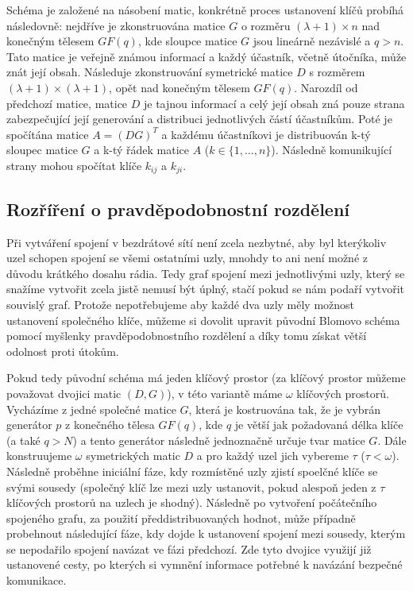\documentclass[11pt,final,twoside]{fithesis2}
\begin{document}
Schéma je založené na násobení matic, konkrétně proces ustanovení klíčů probíhá následovně: 
nejdříve je zkonstruována matice $G$ o rozměru $(\lambda + 1) \times n$ nad konečným tělesem $GF(q)$, kde sloupce matice $G$ jsou lineárně nezávislé a $q > n$.
Tato matice je veřejně známou informací a každý účastník, včetně útočníka, může znát její obsah. Následuje zkonstruování symetrické matice $D$ s rozměrem $(\lambda + 1) \times (\lambda + 1) $, 
opět nad konečným tělesem $GF(q)$. Narozdíl od předchozí matice, matice $D$ je tajnou informací a celý její obsah zná pouze strana zabezpečující její generování a distribuci jednotlivých částí 
účastníkům. Poté je spočítána matice $A= (DG)^T$ a každému účastníkovi je distribuován k-tý sloupec matice $G$ a k-tý řádek matice $A$ ($k \in \{1, \dots , n\}$). Následně komunikující strany
mohou spočítat klíče $k_{ij}$ a $k_{ji}$.  

\subsection{Rozříření o pravděpodobnostní rozdělení}
Při vytváření spojení v bezdrátové sítí není zcela nezbytné, aby byl kterýkoliv uzel schopen spojení se všemi ostatními uzly, mnohdy to ani není možné z důvodu krátkého dosahu rádia. Tedy
graf spojení mezi jednotlivými uzly, který se snažíme vytvořit zcela jistě nemusí být úplný, stačí pokud se nám podaří vytvořit souvislý graf. Protože nepotřebujeme aby každé dva uzly 
měly možnost ustanovení společného klíče, můžeme si dovolit upravit původní Blomovo schéma pomocí myšlenky pravděpodobnostního rozdělení a díky tomu získat větší odolnost proti útokům. 

Pokud tedy původní schéma má jeden klíčový prostor (za klíčový prostor můžeme považovat dvojici matic $(D, G)$), v této variantě máme $\omega$ klíčových prostorů. Vycházíme z jedné společné matice $G$, 
která je kostruována tak, že je vybrán generátor $p$ z konečného tělesa $GF(q)$, kde $q$ je větší jak požadovaná délka klíče (a také $q > N$) a tento generátor následně jednoznačně určuje tvar matice $G$.
Dále konstruujeme $\omega$ symetrických matic $D$ a pro každý uzel jich vybereme $\tau$ ($\tau < \omega$). Následně proběhne iniciální fáze, kdy rozmístěné uzly zjistí spoelčné klíče se svými sousedy
(společný klíč lze mezi uzly ustanovit, pokud alespoň jeden z $\tau$ klíčových prostorů na uzlech je shodný). Následně po vytvoření počátečního spojeného grafu, za použití předdistribuovaných hodnot, 
může případně probehnout následující fáze, kdy dojde k ustanovení spojení mezi sousedy, kterým se nepodařilo spojení navázat ve fázi předchozí. Zde tyto dvojice využijí již ustanovené cesty, po kterých si 
vymnění informace potřebné k navázání bezpečné komunikace. 
\end{document}
